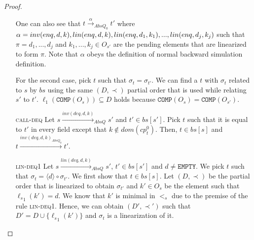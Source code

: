 \begin{proof}
\begin{itemize}
One can also see that $t \xrightarrow{\alpha}_{AbsQ_0} t'$ where $\alpha = inv(enq,d,k), lin(enq,d,k), \\lin(enq,d_1,k_1), ..., lin(enq,d_j,k_j)$ such that $\pi = d_1,...,d_j$ and $k_1,...,k_j \in O_{s'}$ are the pending elements that are  linearized to form $\pi$. Note that $\alpha$ obeys the definition of normal backward simulation definition.

For the second case, pick $t$ such that $\sigma_t = \sigma_{t'}$. We can find a $t$ with $\sigma_t$ related to $s$ by $bs$ using the same $(D,\prec)$ partial order that is used while relating $s'$ to $t'$. $\ell_1(\texttt{COMP}(O_s)) \subseteq D$ holds because $\texttt{COMP}(O_s) = \texttt{COMP}(O_{s'})$.

\item[\textsc{call-deq}] Let $s \xrightarrow{inv(deq,d,k)}_{AbsQ} s'$ and $t' \in bs[s']$. Pick $t$ such that it is equal to $t'$ in every field except that $k \notin dom(cp^0_t)$. Then, $t \in bs[s]$ and $t \xrightarrow{inv(deq,d,k)_{AbsQ_0}} t'$.

\item[\textsc{lin-deq1}]  Let $s \xrightarrow{lin(deq,d,k)}_{AbsQ} s'$, $t' \in bs[s']$ and $d \neq \texttt{EMPTY}$. We pick $t$ such that $\sigma_t = \langle d \rangle \circ \sigma_{t'}$. We first show that $t \in bs[s]$. Let $(D, \prec)$ be the partial order that is linearized to obtain $\sigma_{t'}$ and $k' \in O_s$ be the element such that ${\ell_s}_1(k') = d$. We know that $k'$ is minimal in $<_s$ due to the premise of the rule \textsc{lin-deq1}. Hence, we can obtain $(D', \prec')$ such that $D' = D \cup \{{\ell_s}_1(k')\}$ and $\sigma_t$ is a linearization of it.


\end{itemize}
\end{proof}
